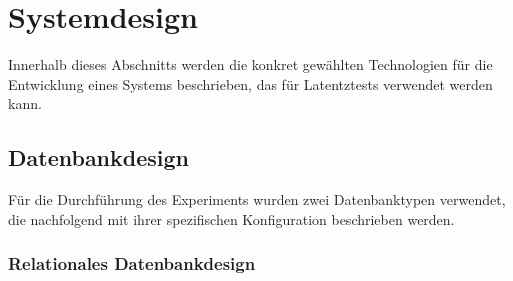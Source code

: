 \chapter{Systemdesign} %
\label{sec:systemdesign}
Innerhalb dieses Abschnitts werden die konkret gewählten Technologien für die Entwicklung eines Systems beschrieben, das für Latentztests verwendet werden kann.
\section{Datenbankdesign} %
Für die Durchführung des Experiments wurden zwei Datenbanktypen verwendet, die nachfolgend mit ihrer spezifischen Konfiguration beschrieben werden.
\label{sec:datenbankdesign}
\subsection{Relationales Datenbankdesign} %
\label{sec:relationalesdatenbankdesign}

